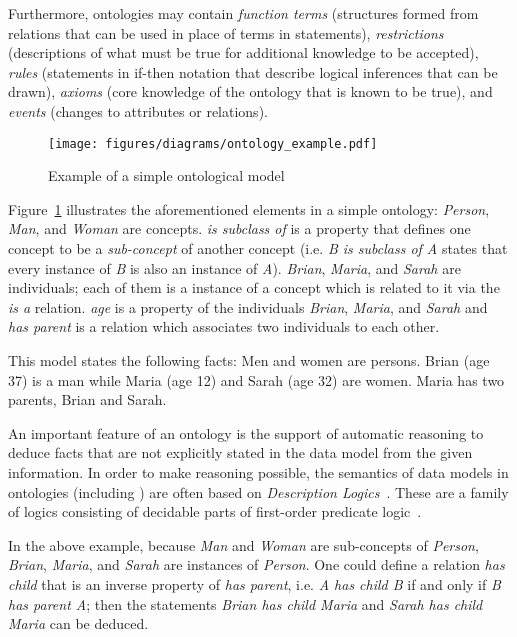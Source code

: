 Furthermore, ontologies may contain \emph{function terms} (structures formed from relations that can be used in place of terms in statements), \emph{restrictions} (descriptions of what must be true for additional knowledge to be accepted), \emph{rules} (statements in if-then notation that describe logical inferences that can be drawn), \emph{axioms} (core knowledge of the ontology that is known to be true), and \emph{events} (changes to attributes or relations).

\vspace{1em}

\begin{figure}
\centering
\texttt{[image: figures/diagrams/ontology\_example.pdf]}
\caption{Example of a simple ontological model}
\label{fig:ontology_example}
\end{figure}

Figure~\ref{fig:ontology_example} illustrates the aforementioned elements in a simple ontology: \emph{Person}, \emph{Man}, and \emph{Woman} are concepts. \emph{is subclass of} is a property that defines one concept to be a \emph{sub-concept} of another concept (i.e. \emph{B is subclass of A} states that every instance of \emph{B} is also an instance of \emph{A}). \emph{Brian}, \emph{Maria}, and \emph{Sarah} are individuals; each of them is a instance of a concept which is related to it via the \emph{is a} relation. \emph{age} is a property of the individuals \emph{Brian}, \emph{Maria}, and \emph{Sarah} and \emph{has parent} is a relation which associates two individuals to each other.

This model states the following facts: Men and women are persons. Brian (age 37) is a man while Maria (age 12) and Sarah (age 32) are women. Maria has two parents, Brian and Sarah.

\vspace{1em}

An important feature of an ontology is the support of automatic reasoning to deduce facts that are not explicitly stated in the data model from the given information. In order to make reasoning possible, the semantics of data models in ontologies (including ) are often based on \emph{Description Logics}~\cite{OWL,SROIQ}. These are a family of logics consisting of decidable parts of first-order predicate logic~\cite{FirstOrderLogic}.

In the above example, because \emph{Man} and \emph{Woman} are sub-concepts of \emph{Person}, \emph{Brian}, \emph{Maria}, and \emph{Sarah} are instances of \emph{Person}. One could define a relation \emph{has child} that is an inverse property of \emph{has parent}, i.e. \emph{A has child B} if and only if \emph{B has parent A}; then the statements \emph{Brian has child Maria} and \emph{Sarah has child Maria} can be deduced.

